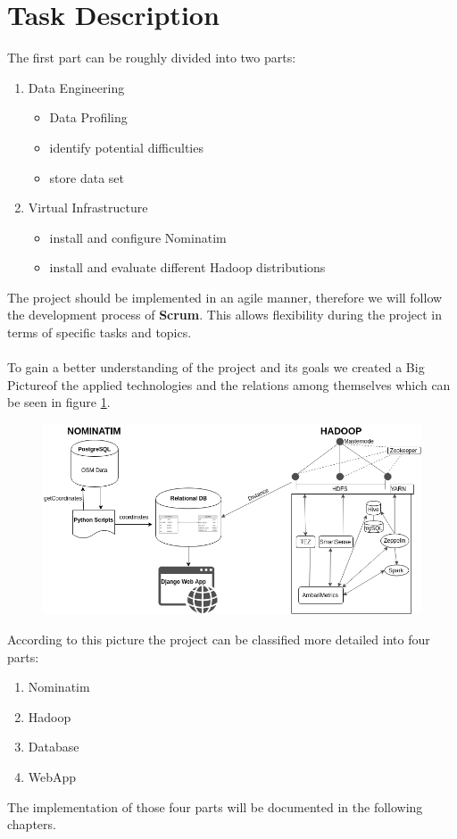 
\section{Task Description}\label{tasks}

The first part can be roughly divided into two parts:
\begin{enumerate}
\item Data Engineering
\begin{itemize}
\item Data Profiling
\item identify potential difficulties
\item store data set
\end{itemize}
\item Virtual Infrastructure
\begin{itemize}
\item install and configure Nominatim
\item install and evaluate different Hadoop distributions
\end{itemize}
\end{enumerate}
The project should be implemented in an agile manner, therefore we will follow the development process of \textbf{Scrum}. This allows flexibility during the project in terms of specific tasks and topics.
\\\\
To gain a better understanding of the project and its goals we created a \glqq Big Picture\grqq of the applied technologies and the relations among themselves which can be seen in figure \ref{fig:big}.

\begin{figure}[H]
\hspace{-0.9cm}
\includegraphics[width=1.1\textwidth]{img/big}
\label{fig:big}
\end{figure}
\noindent According to this picture the project can be classified more detailed into four parts:
\begin{enumerate}
\item Nominatim
\item Hadoop
\item Database
\item WebApp
\end{enumerate}
The implementation of those four parts will be documented in the following chapters.
